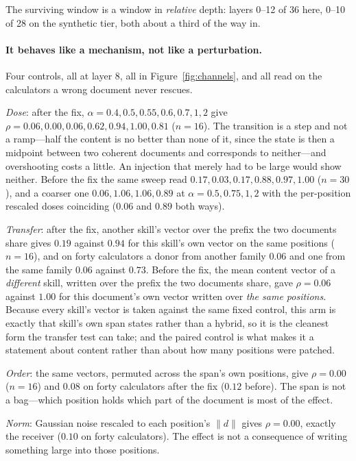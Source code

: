 \documentclass{article}
\newcommand{\dvec}{\ensuremath{d}}
\begin{document}
The surviving window is a window in \emph{relative} depth: layers 0--12 of 36
here, 0--10 of 28 on the synthetic tier, both about a third of the way in.



\paragraph{It behaves like a mechanism, not like a perturbation.} Four
controls, all at layer $8$, all in Figure~\ref{fig:channels}, and all read on
the calculators a wrong document never rescues.

\emph{Dose}: after the fix, $\alpha = 0.4, 0.5, 0.55, 0.6, 0.7, 1, 2$ give
$\rho = 0.06, 0.00, 0.06, 0.62, 0.94, 1.00, 0.81$ ($n=16$). The transition is a
step and not a ramp---half the content is no better than none of it, since the
state is then a midpoint between two coherent documents and corresponds to
neither---and overshooting costs a little. An injection that merely had to be
large would show neither. Before the fix the same sweep read $0.17, 0.03, 0.17,
0.88, 0.97, 1.00$ ($n=30$), and a coarser one $0.06, 1.06, 1.06, 0.89$ at
$\alpha = 0.5, 0.75, 1, 2$ with the per-position rescaled doses coinciding
($0.06$ and $0.89$ both ways).

\emph{Transfer}: after the fix, another skill's vector over the prefix the two
documents share gives $0.19$ against $0.94$ for this skill's own vector on the
same positions ($n=16$), and on forty calculators a donor from another family
$0.06$ and one from the same family $0.06$ against $0.73$. Before the fix, the
mean content vector of a \emph{different} skill, written over the prefix the two
documents share, gave $\rho = 0.06$ against $1.00$ for
this document's own vector written over \emph{the same positions}. Because every
skill's vector is taken against the same fixed control, this arm is exactly that
skill's own span states rather than a hybrid, so it is the cleanest form the
transfer test can take; and the paired control is what makes it a statement about
content rather than about how many positions were patched.

\emph{Order}: the same vectors, permuted across the span's own positions, give
$\rho = 0.00$ ($n=16$) and $0.08$ on forty calculators after the fix ($0.12$
before). The span is not a bag---which position holds which part of the
document is most of the effect.

\emph{Norm}: Gaussian noise rescaled to each position's $\|\dvec\|$ gives
$\rho = 0.00$, exactly the receiver ($0.10$ on forty calculators). The effect is not a consequence of writing
something large into those positions.
\end{document}
